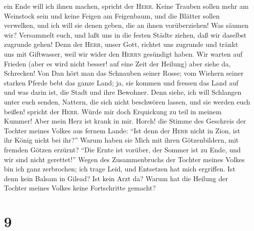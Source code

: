 ein Ende will ich ihnen machen, spricht der \textsc{Herr}. Keine Trauben
sollen mehr am Weinstock sein und keine Feigen am Feigenbaum, und die
Blätter sollen verwelken, und ich will sie denen geben, die an ihnen
vorüberziehen!  Was säumen wir? Versammelt euch, und laßt
uns in die festen Städte ziehen, daß wir daselbst zugrunde gehen! Denn
der \textsc{Herr}, unser Gott, richtet uns zugrunde und tränkt uns mit
Giftwasser, weil wir wider den \textsc{Herrn} gesündigt haben.
 Wir warten auf Frieden (aber es wird nicht besser! auf
eine Zeit der Heilung) aber siehe da, Schrecken!  Von Dan
hört man das Schnauben seiner Rosse; vom Wiehern seiner starken Pferde
bebt das ganze Land; ja, sie kommen und fressen das Land auf und was
darin ist, die Stadt und ihre Bewohner.  Denn siehe, ich
will Schlangen unter euch senden, Nattern, die sich nicht beschwören
lassen, und sie werden euch beißen! spricht der \textsc{Herr}.
 Würde mir doch Erquickung zu teil in meinem Kummer! Aber
mein Herz ist krank in mir.  Horch! die Stimme des
Geschreis der Tochter meines Volkes aus fernem Lande: ``Ist denn der
\textsc{Herr} nicht in Zion, ist ihr König nicht bei ihr?'' Warum haben
sie Mich mit ihren Götzenbildern, mit fremden Götzen erzürnt?
 ``Die Ernte ist vorüber, der Sommer ist zu Ende, und wir
sind nicht gerettet!''  Wegen des Zusammenbruchs der
Tochter meines Volkes bin ich ganz zerbrochen; ich trage Leid, und
Entsetzen hat mich ergriffen.  Ist denn kein Balsam in
Gilead? Ist kein Arzt da? Warum hat die Heilung der Tochter meines
Volkes keine Fortschritte gemacht?

\hypertarget{section-8}{%
\section{9}\label{section-8}}

